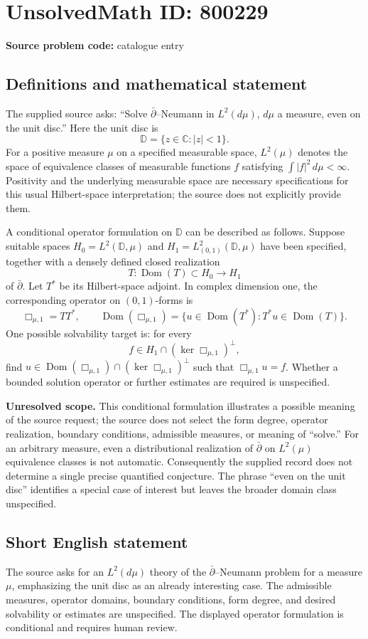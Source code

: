 \documentclass[11pt]{article}
\newcommand{\C}{\mathbb{C}}
\begin{document}
\section*{UnsolvedMath ID: 800229}
\textbf{Source problem code:} catalogue entry
\subsection{Definitions and mathematical statement}
The supplied source asks: ``Solve $\bar\partial$--Neumann in $L^2(d\mu)$, $d\mu$ a measure, even on the unit disc.'' Here the unit disc is
\[
\mathbb D=\{z\in\C:|z|<1\}.
\]
For a positive measure $\mu$ on a specified measurable space, $L^2(\mu)$ denotes the space of equivalence classes of measurable functions $f$ satisfying $\int |f|^2\,d\mu<\infty$. Positivity and the underlying measurable space are necessary specifications for this usual Hilbert-space interpretation; the source does not explicitly provide them.

A conditional operator formulation on $\mathbb D$ can be described as follows. Suppose suitable spaces $H_0=L^2(\mathbb D,\mu)$ and $H_1=L^2_{(0,1)}(\mathbb D,\mu)$ have been specified, together with a densely defined closed realization
\[
T:\operatorname{Dom}(T)\subset H_0\longrightarrow H_1
\]
of $\bar\partial$. Let $T^*$ be its Hilbert-space adjoint. In complex dimension one, the corresponding operator on $(0,1)$-forms is
\[
\Box_{\mu,1}=TT^*,\qquad
\operatorname{Dom}(\Box_{\mu,1})
=\{u\in\operatorname{Dom}(T^*):T^*u\in\operatorname{Dom}(T)\}.
\]
One possible solvability target is: for every
\[
f\in H_1\cap(\ker\Box_{\mu,1})^\perp,
\]
find $u\in\operatorname{Dom}(\Box_{\mu,1})\cap(\ker\Box_{\mu,1})^\perp$ such that $\Box_{\mu,1}u=f$. Whether a bounded solution operator or further estimates are required is unspecified.

\textbf{Unresolved scope.} This conditional formulation illustrates a possible meaning of the source request; the source does not select the form degree, operator realization, boundary conditions, admissible measures, or meaning of ``solve.'' For an arbitrary measure, even a distributional realization of $\bar\partial$ on $L^2(\mu)$ equivalence classes is not automatic. Consequently the supplied record does not determine a single precise quantified conjecture. The phrase ``even on the unit disc'' identifies a special case of interest but leaves the broader domain class unspecified.
\subsection{Short English statement}
The source asks for an $L^2(d\mu)$ theory of the $\bar\partial$--Neumann problem for a measure $\mu$, emphasizing the unit disc as an already interesting case. The admissible measures, operator domains, boundary conditions, form degree, and desired solvability or estimates are unspecified. The displayed operator formulation is conditional and requires human review.
\end{document}
